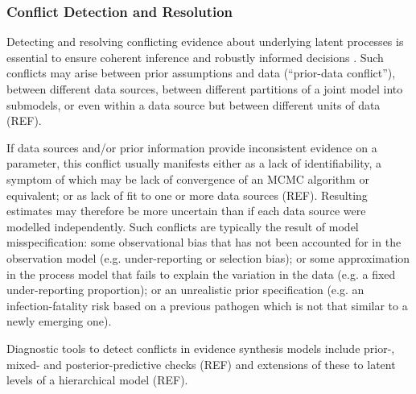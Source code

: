 \documentclass{article}
\begin{document}
\subsubsection{Conflict Detection and Resolution}

Detecting and resolving conflicting evidence about underlying latent processes is essential to ensure coherent inference and robustly informed decisions \citep{sherratt2021exploring}. Such conflicts may arise between prior assumptions and data (``prior-data conflict''), between different data sources, between different partitions of a joint model into submodels, or even within a data source but between different units of data (REF).

If data sources and/or prior information provide inconsistent evidence on a parameter, this conflict usually manifests either as a lack of identifiability, a symptom of which may be lack of convergence of an MCMC algorithm or equivalent; or as lack of fit to one or more data sources (REF). Resulting estimates may therefore be more uncertain than if each data source were modelled independently. Such conflicts are typically the result of model misspecification: some observational bias that has not been accounted for in the observation model (e.g. under-reporting or selection bias); or some approximation in the process model that fails to explain the variation in the data (e.g. a fixed under-reporting proportion); or an unrealistic prior specification (e.g. an infection-fatality risk based on a previous pathogen which is not that similar to a newly emerging one).  

Diagnostic tools to detect conflicts in evidence synthesis models include prior-, mixed- and posterior-predictive checks (REF) and extensions of these to latent levels of a hierarchical model (REF).
\end{document}

